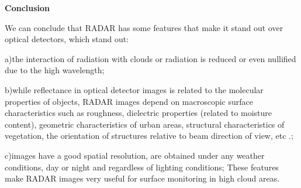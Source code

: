 \documentclass[a4paper,12pt]{report}
\begin{document}
	\begin{flushleft}
\textbf{Conclusion}
\end{flushleft}

We can conclude that RADAR has some features that make it stand out over optical detectors, which stand out:

a)the interaction of radiation with clouds or radiation is reduced or even nullified due to the high wavelength;

b)while reflectance in optical detector images is related to the molecular properties of objects, RADAR images depend on macroscopic surface characteristics such as roughness, dielectric properties (related to moisture content), geometric characteristics of urban areas, structural characteristics of vegetation, the orientation of structures relative to beam direction of view, etc .;

c)images have a good spatial resolution, are obtained under any weather conditions, day or night and regardless of lighting conditions; These features make RADAR images very useful for surface monitoring in high cloud areas.
\end{document}
